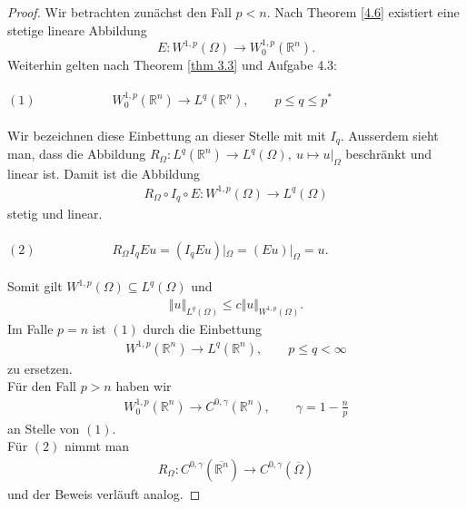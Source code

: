 \documentclass[
paper=a4,
bibtotocnumbered,
liststotocnumbered,
tablecaptionabove,
pointlessnumbers,
twoside,
openright,
10pt
]
{report}
\theoremstyle{definition}
\numberwithin{equation}{chapter}
\begin{document}
\begin{proof}
Wir betrachten zunächst den Fall $p<n$. Nach Theorem \ref{4.6} existiert eine stetige lineare Abbildung
\begin{equation*}
E:W^{1,p} (\Omega) \rightarrow W_0^{1,p}(\mathbb{R}^n).
\end{equation*}
Weiterhin gelten nach Theorem \ref{thm 3.3} und Aufgabe 4.3:
\\
\\
$(1) \qquad \qquad \qquad W_0^{1,p}(\mathbb{R}^n) \rightarrow L^q (\mathbb{R}^n), \qquad p \leq q \leq p^*$
\\
\\ Wir bezeichnen diese Einbettung an dieser Stelle mit mit $I_q$. Ausserdem sieht man, dass die Abbildung 
 $R_{\Omega}: L^q(\mathbb{R}^n) \rightarrow  L^q(\Omega), \ u \mapsto u|_{\Omega}$ beschränkt und linear ist. Damit ist die Abbildung
\begin{align*}
 R_{\Omega} \circ  I_q \circ E: W^{1,p}(\Omega) \rightarrow L^q (\Omega)
 \end{align*}
 stetig und linear.
 \\
 \\
 $(2) \qquad \qquad \qquad R_{\Omega} I_q E u = (I_q E u)|_{\Omega} = (Eu)|_{\Omega} = u.$
 \\
 \\
 Somit gilt $W^{1,p}(\Omega) \subseteq L^q(\Omega)$ und 
 \begin{align*}
 \Vert u \Vert_{L^q(\Omega)} \leq c \Vert u \Vert_{W^{1,p}(\Omega)}.
 \end{align*}
 Im Falle $p=n$ ist $(1)$ durch die Einbettung 
 \begin{align*}
 W^{1,p}(\mathbb{R}^n) \rightarrow L^q (\mathbb{R}^n), \qquad p \leq q < \infty
 \end{align*}
 zu ersetzen. 
 \\ Für den Fall $p >n$ haben wir 
 \begin{align*}
 W_0^{1,p}(\mathbb{R}^n) \rightarrow C^{0,\gamma}(\mathbb{R}^n), \qquad \gamma = 1 - \frac{n}{p}
 \end{align*}
 an Stelle von $(1)$.
 \\ Für $(2)$ nimmt man
 \begin{align*}
 R_{\Omega}: C^{0,\gamma} (\overline{\mathbb{R}^n}) \rightarrow C^{0,\gamma} (\overline{\Omega})
 \end{align*}
 und der Beweis verläuft analog.
\end{proof}
\end{document}
